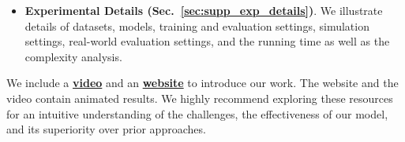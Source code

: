 \begin{itemize}
    \item  \textbf{Experimental Details (Sec.~\ref{sec:supp_exp_details})}. We illustrate details of datasets, models, training and evaluation settings, simulation settings, real-world evaluation settings, and the running time as well as the complexity analysis. 
\end{itemize}


We include a \href{https://projectwebsite7.github.io/gene-dex-manip/static/videos-lowres/video_7.mp4}{\textbf{video}} and an \href{https://projectwebsite7.github.io/gene-dex-manip/}{\textbf{website}} to introduce our work. The website and the video contain animated results. We highly recommend exploring these resources for an intuitive understanding of the challenges, the effectiveness of our model, and its superiority over prior approaches.




